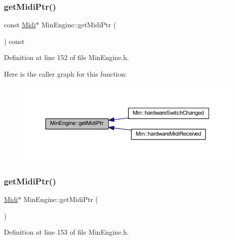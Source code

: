 \subsubsection{\texorpdfstring{get\+Midi\+Ptr()}{getMidiPtr()}\hspace{0.1cm}{\footnotesize\ttfamily [1/2]}}
{\footnotesize\ttfamily const \hyperlink{class_midi}{Midi}$\ast$ Min\+Engine\+::get\+Midi\+Ptr (\begin{DoxyParamCaption}{ }\end{DoxyParamCaption}) const\hspace{0.3cm}{\ttfamily [inline]}}



Definition at line 152 of file Min\+Engine.\+h.

Here is the caller graph for this function\+:
\nopagebreak
\begin{figure}[H]
\begin{center}
\leavevmode
\includegraphics[width=350pt]{d4/d0f/class_min_engine_ab6c3bb750ae223f9b31b94bb2f21f082_icgraph}
\end{center}
\end{figure}
\mbox{\label{class_min_engine_a5584f12b5e32a683a6e542fcc3b2ef30}} 
\subsubsection{\texorpdfstring{get\+Midi\+Ptr()}{getMidiPtr()}\hspace{0.1cm}{\footnotesize\ttfamily [2/2]}}
{\footnotesize\ttfamily \hyperlink{class_midi}{Midi}$\ast$ Min\+Engine\+::get\+Midi\+Ptr (\begin{DoxyParamCaption}{ }\end{DoxyParamCaption})\hspace{0.3cm}{\ttfamily [inline]}}



Definition at line 153 of file Min\+Engine.\+h.

